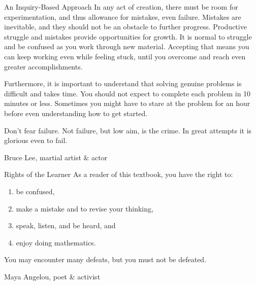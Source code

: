 \begin{section}{An Inquiry-Based Approach}
In any act of creation, there must be room for experimentation, and thus allowance for mistakes, even failure. Mistakes are inevitable, and they should not be an obstacle to further progress. Productive struggle and mistakes provide opportunities for growth.  It is normal to struggle and be confused as you work through new material. Accepting that means you can keep working even while feeling stuck, until you overcome and reach even greater accomplishments.

Furthermore, it is important to understand that solving genuine problems is difficult and takes time.  You should not expect to complete each problem in 10 minutes or less.  Sometimes you might have to stare at the problem for an hour before even understanding how to get started.



\epigraph{Don't fear failure.  Not failure, but low aim, is the crime. In great attempts it is glorious even to fail.}{Bruce Lee, martial artist \& actor}

\end{section}

\begin{section}{Rights of the Learner}\label{sec:Rights of the Learner}
As a reader of this textbook, you have the right to:
\begin{enumerate}
\item be confused,
\item make a mistake and to revise your thinking,
\item speak, listen, and be heard, and
\item enjoy doing mathematics.
\end{enumerate}

\epigraph{You may encounter many defeats, but you must not be defeated.}{Maya Angelou, poet \& activist}

\end{section}

